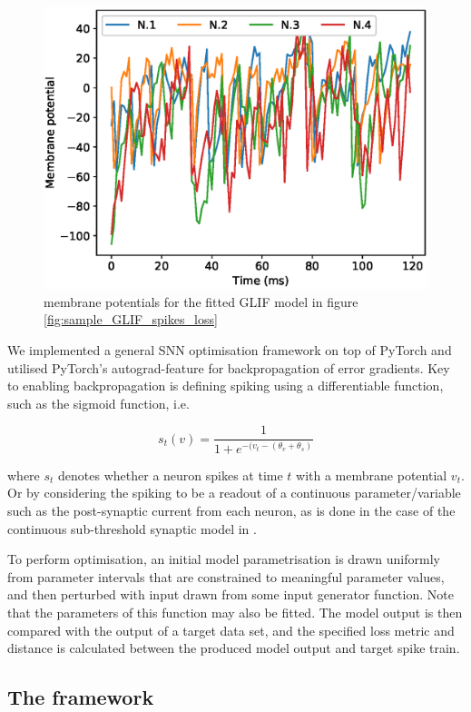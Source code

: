 \documentclass[mphil,deptreport,ianc]{infthesis} %
\begin{document}
\begin{figure}
    \centering
    \includegraphics[width=0.6\columnwidth]{figures/samples/membrane_potentials/export_sample_GLIF_white_noise.eps}
    \caption{membrane potentials for the fitted GLIF model in figure \ref{fig:sample_GLIF_spikes_loss}}
    \label{fig:sample_GLIF_vs}
\end{figure}

We implemented a general SNN optimisation framework on top of PyTorch \cite{Paszke2017} and utilised PyTorch's autograd-feature for backpropagation of error gradients.
Key to enabling backpropagation is defining spiking using a differentiable function, such as the sigmoid function, i.e.

\begin{equation}
    s_t(v) = \frac{1}{1+e^{-(v_t-(\theta_v + \theta_s)}}
\end{equation}

where $s_t$ denotes whether a neuron spikes at time $t$ with a membrane potential $v_t$. Or by considering the spiking to be a readout of a continuous parameter/variable such as the post-synaptic current from each neuron, as is done in the case of the continuous sub-threshold synaptic model in \cite{Huh2017}.

To perform optimisation, an initial model parametrisation is drawn uniformly from parameter intervals that are constrained to meaningful parameter values, and then perturbed with input drawn from some input generator function. Note that the parameters of this function may also be fitted.
The model output is then compared with the output of a target data set, and the specified loss metric and distance is calculated between the produced model output and target spike train.

\subsection{The framework}
\end{document}
